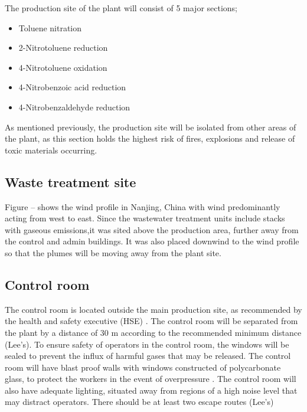 The production site of the plant will consist of 5 major sections; 

\begin{itemize}
    \item Toluene nitration
    \item 2-Nitrotoluene reduction 
    \item 4-Nitrotoluene oxidation 
    \item 4-Nitrobenzoic acid reduction 
    \item 4-Nitrobenzaldehyde reduction 
\end{itemize}

As mentioned previously, the production site will be isolated from other areas of the plant, as this section holds the highest risk of fires, explosions  and release of toxic materials occurring. 

\subsection{Waste treatment site}

Figure -- shows the wind profile in Nanjing, China with wind predominantly acting from west to east. Since the wastewater treatment units include stacks with gaseous emissions,it was sited above the production area, further away from the control and admin buildings. It was also placed downwind to the wind profile so that the plumes will be moving away from the plant site. 

\subsection{Control room}

The control room is located outside the main production site, as recommended by the health and safety executive (HSE) \cite{health_and_safety_executive_control_nodate}. The control room will be separated from the plant by a distance of 30 m according to the recommended minimum distance (Lee's). To ensure safety of operators in the control room, the windows will be sealed to prevent the influx of harmful gases that may be released. The control room will have blast proof walls with windows constructed of polycarbonate glass, to protect the workers in the event of overpressure \cite{health_and_safety_executive_control_nodate}. The control room will also have adequate lighting, situated away from regions of a high noise level that may distract operators. There should be at least two escape routes (Lee's)

